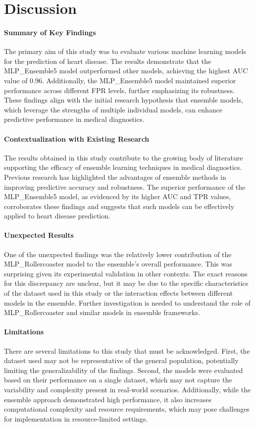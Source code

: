 \section{Discussion}
\paragraph{Summary of Key Findings}
The primary aim of this study was to evaluate various machine learning models for the prediction of heart disease. The results demonstrate that the MLP\_Ensemble5 model outperformed other models, achieving the highest AUC value of 0.96. Additionally, the MLP\_Ensemble5 model maintained superior performance across different FPR levels, further emphasizing its robustness. These findings align with the initial research hypothesis that ensemble models, which leverage the strengths of multiple individual models, can enhance predictive performance in medical diagnostics.

\paragraph{Contextualization with Existing Research}
The results obtained in this study contribute to the growing body of literature supporting the efficacy of ensemble learning techniques in medical diagnostics. Previous research has highlighted the advantages of ensemble methods in improving predictive accuracy and robustness. The superior performance of the MLP\_Ensemble5 model, as evidenced by its higher AUC and TPR values, corroborates these findings and suggests that such models can be effectively applied to heart disease prediction.

\paragraph{Unexpected Results}
One of the unexpected findings was the relatively lower contribution of the MLP\_Rollercoaster model to the ensemble’s overall performance. This was surprising given its experimental validation in other contexts. The exact reasons for this discrepancy are unclear, but it may be due to the specific characteristics of the dataset used in this study or the interaction effects between different models in the ensemble. Further investigation is needed to understand the role of MLP\_Rollercoaster and similar models in ensemble frameworks.

\paragraph{Limitations}
There are several limitations to this study that must be acknowledged. First, the dataset used may not be representative of the general population, potentially limiting the generalizability of the findings. Second, the models were evaluated based on their performance on a single dataset, which may not capture the variability and complexity present in real-world scenarios. Additionally, while the ensemble approach demonstrated high performance, it also increases computational complexity and resource requirements, which may pose challenges for implementation in resource-limited settings.

